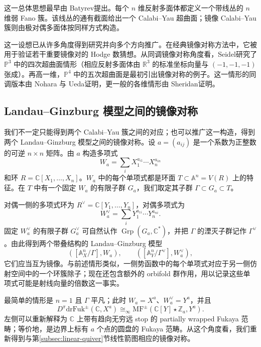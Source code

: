 这一总体思想最早由 Batyrev提出。每个 $n$ 维反射多面体都定义一个带线丛的 $n$ 维弱 Fano 簇。该线丛的通有截面给出一个 Calabi--Yau 超曲面；镜像 Calabi--Yau 簇则由极对偶多面体按同样方式构造。

这一设想已从许多角度得到研究并向多个方向推广。在经典镜像对称方法中，它被用于验证若干重要镜像对的 Hodge 数猜想。从同调镜像对称角度看，Seidel研究了 $\mathbb P^3$ 中的四次超曲面情形（相应反射多面体由 $\mathbb R^3$ 的标准坐标向量与 $(-1,-1,-1)$ 张成）。再高一维，$\mathbb P^4$ 中的五次超曲面是最初引出镜像对称的例子。这一情形的同调版本由 Nohara 与 Ueda证明，更一般的各维情形由 Sheridan证明。

\subsection*{Landau--Ginzburg 模型之间的镜像对称}
我们不一定只能得到两个 Calabi--Yau 簇之间的对应；也可以推广这一构造，得到两个 Landau--Ginzburg 模型之间的镜像对称。设 $a=(a_{ij})$ 是一个系数为正整数的可逆 $n\times n$ 矩阵。由 $a$ 构造多项式
\[
  W_a=\sum_iX_1^{a_{i1}}\cdots X_n^{a_{in}}
\]
和环 $R=\mathbb C[X_1,\ldots,X_n]$。$W_a$ 中的每个单项式都是环面 $T\subset\mathbb A^n=V(R)$ 上的特征。在 $T$ 中有一个固定 $W_a$ 的有限子群 $G_a$，我们取定其子群 $\Gamma\subset G_a\subset T$。

对偶一侧的多项式环为 $R^\vee=\mathbb C[Y_1,\ldots,Y_n]$，对偶多项式为
\[
  W_a^\vee=\sum_iY_1^{a_{1i}}\cdots Y_n^{a_{ni}}.
\]
固定 $W_a^\vee$ 的有限子群 $G_a^\vee$ 可自然认作 $\operatorname{Grp}(G_a,\mathbb C^*)$，并把 $\Gamma$ 的湮灭子群记作 $\Gamma^\vee$。由此得到两个带叠结构的 Landau--Ginzburg 模型
\[
  ([\mathbb A_X^n/\Gamma],W_a),
  \qquad ([\mathbb A_Y^n/\Gamma^\vee],W_a^\vee),
\]
它们应当互为镜像。与前述情形类似，一侧势函数中的每个单项式对应于另一侧仿射空间中的一个环簇除子；现在还包含额外的 orbifold 群作用，用以记录这些单项式可能是射线向量的倍数这一事实。

最简单的情形是 $n=1$ 且 $\Gamma$ 平凡；此时 $W_a=X^a$、$W_a^\vee=Y^a$，并且
\[
  D^\pi\mathrm{drFuk}^{\pm}(\mathbb C,X^a)
  \cong_\infty\mathrm{MF}^{\pm}(\mathbb C[Y]\star\mathbb Z_a,Y^a).
\]
左侧可以重新解释为 $\mathbb C$ 上带有趋向无穷远 stop 的 partially wrapped Fukaya 范畴；等价地，是边界上标有 $a$ 个点的圆盘的 Fukaya 范畴。从这个角度看，我们重新得到与第\ref{subsec:linear-quiver}节线性箭图相应的镜像对称。

